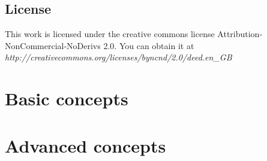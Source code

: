 \documentclass[a4paper,10pt]{report}
\begin{document}
\section{License}

This work is licensed under the creative commons license Attribution-NonCommercial-NoDerivs 2.0.
You can obtain it at \textit{http://creativecommons.org/licenses/by\-nc\-nd/2.0/deed.en\_GB}





\chapter{Basic concepts}






\chapter{Advanced concepts}





\newpage
\end{document}
